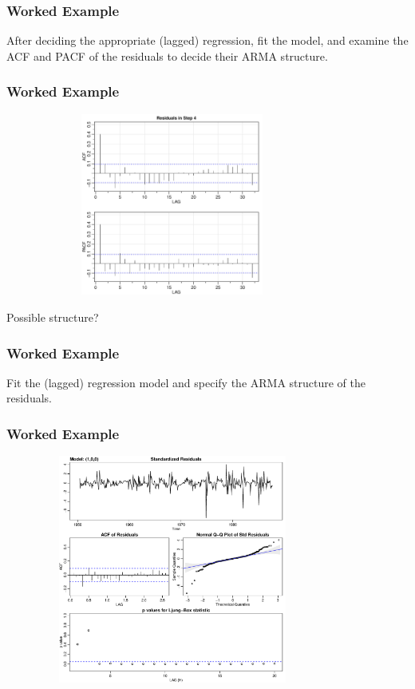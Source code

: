 \documentclass[%
xcolor=pdftex]{beamer}
\begin{document}
\begin{frame}
\frametitle{Worked Example}

After deciding the appropriate (lagged) regression, fit the model, and examine the ACF and PACF of the residuals to decide their ARMA structure.

\end{frame}

\begin{frame}
\frametitle{Worked Example}

\includegraphics[width=110mm, height=60mm]{residuals_soi.pdf}

Possible structure?

\end{frame}

\begin{frame}
\frametitle{Worked Example}

Fit the (lagged) regression model and specify the ARMA structure of the residuals.

\end{frame}

\begin{frame}
\frametitle{Worked Example}

\includegraphics[width=110mm, height=75mm]{diag1.pdf}

\end{frame}
\end{document}

